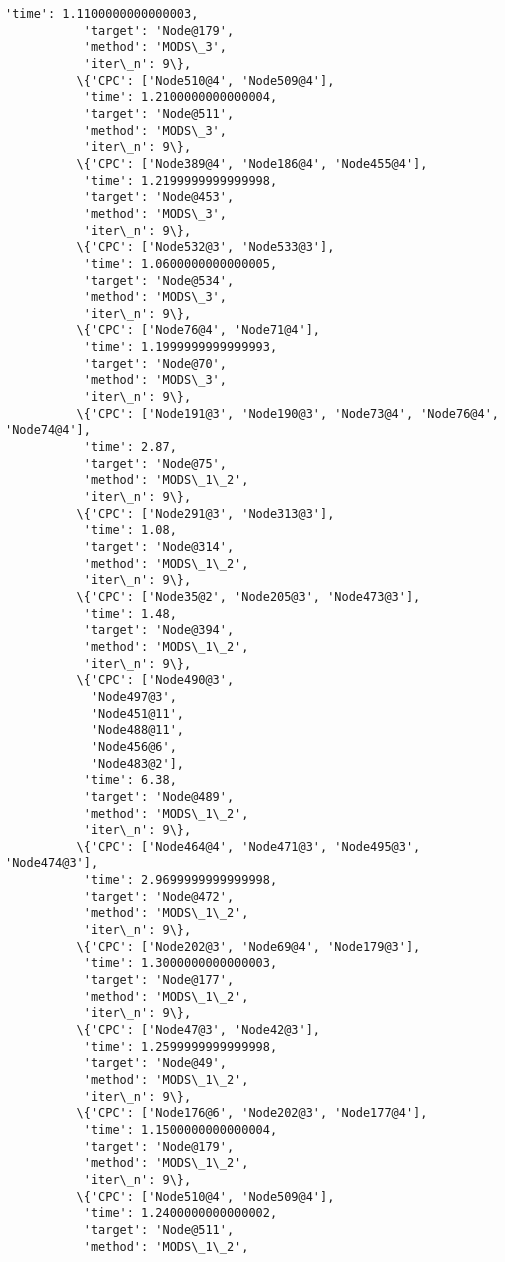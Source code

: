 \documentclass[11pt]{article}
\begin{document}
\begin{Verbatim}[commandchars=\\\{\}]
           'time': 1.1100000000000003,
           'target': 'Node@179',
           'method': 'MODS\_3',
           'iter\_n': 9\},
          \{'CPC': ['Node510@4', 'Node509@4'],
           'time': 1.2100000000000004,
           'target': 'Node@511',
           'method': 'MODS\_3',
           'iter\_n': 9\},
          \{'CPC': ['Node389@4', 'Node186@4', 'Node455@4'],
           'time': 1.2199999999999998,
           'target': 'Node@453',
           'method': 'MODS\_3',
           'iter\_n': 9\},
          \{'CPC': ['Node532@3', 'Node533@3'],
           'time': 1.0600000000000005,
           'target': 'Node@534',
           'method': 'MODS\_3',
           'iter\_n': 9\},
          \{'CPC': ['Node76@4', 'Node71@4'],
           'time': 1.1999999999999993,
           'target': 'Node@70',
           'method': 'MODS\_3',
           'iter\_n': 9\},
          \{'CPC': ['Node191@3', 'Node190@3', 'Node73@4', 'Node76@4', 'Node74@4'],
           'time': 2.87,
           'target': 'Node@75',
           'method': 'MODS\_1\_2',
           'iter\_n': 9\},
          \{'CPC': ['Node291@3', 'Node313@3'],
           'time': 1.08,
           'target': 'Node@314',
           'method': 'MODS\_1\_2',
           'iter\_n': 9\},
          \{'CPC': ['Node35@2', 'Node205@3', 'Node473@3'],
           'time': 1.48,
           'target': 'Node@394',
           'method': 'MODS\_1\_2',
           'iter\_n': 9\},
          \{'CPC': ['Node490@3',
            'Node497@3',
            'Node451@11',
            'Node488@11',
            'Node456@6',
            'Node483@2'],
           'time': 6.38,
           'target': 'Node@489',
           'method': 'MODS\_1\_2',
           'iter\_n': 9\},
          \{'CPC': ['Node464@4', 'Node471@3', 'Node495@3', 'Node474@3'],
           'time': 2.9699999999999998,
           'target': 'Node@472',
           'method': 'MODS\_1\_2',
           'iter\_n': 9\},
          \{'CPC': ['Node202@3', 'Node69@4', 'Node179@3'],
           'time': 1.3000000000000003,
           'target': 'Node@177',
           'method': 'MODS\_1\_2',
           'iter\_n': 9\},
          \{'CPC': ['Node47@3', 'Node42@3'],
           'time': 1.2599999999999998,
           'target': 'Node@49',
           'method': 'MODS\_1\_2',
           'iter\_n': 9\},
          \{'CPC': ['Node176@6', 'Node202@3', 'Node177@4'],
           'time': 1.1500000000000004,
           'target': 'Node@179',
           'method': 'MODS\_1\_2',
           'iter\_n': 9\},
          \{'CPC': ['Node510@4', 'Node509@4'],
           'time': 1.2400000000000002,
           'target': 'Node@511',
           'method': 'MODS\_1\_2',

\end{Verbatim}
\end{document}
